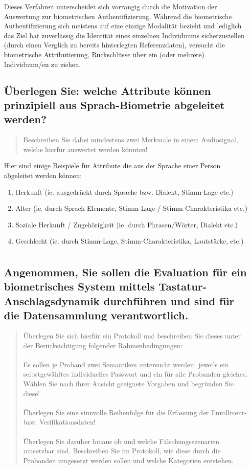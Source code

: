 \documentclass{article}
\newcommand{\annotation}[1]{
    \begin{quote}
    	\begin{textit}{#1}\end{textit}
    \end{quote}
}
\begin{document}
Dieses Verfahren unterscheidet sich vorrangig durch die Motivation der Auswertung zur biometrischen Authentifizierung. 
Während die biometrische Authentifizierung sich meistens auf eine einzige Modalität bezieht und lediglich das Ziel hat
zuverlässig die Identität eines einzelnen Individuums sicherzustellen (durch einen Verglich zu bereits hinterlegten 
Referenzdaten), versucht die biometrische Attributierung, Rückschlüsse über ein (oder mehrere) Individuum/en zu ziehen.

\subsection{Überlegen Sie: welche Attribute können prinzipiell aus Sprach-Biometrie abgeleitet werden?}

\annotation{Beschreiben Sie dabei mindestens zwei Merkmale in einem Audiosignal, welche hierfür auswertet werden könnten!}

Hier sind einige Beispiele für Attribute die aus der Sprache einer Person abgeleitet werden können:

\begin{enumerate}
	\item Herkunft (ie. ausgedrückt durch Sprache bzw. Dialekt, Stimm-Lage etc.)
	\item Alter (ie. durch Sprach-Elemente, Stimm-Lage / Stimm-Charakteristika etc.)
	\item Soziale Herkunft / Zugehörigkeit (ie. durch Phrasen/Wörter, Dialekt etc.)
	\item Geschlecht (ie. durch Stimm-Lage, Stimm-Charakteristika, Lautstärke, etc.)
\end{enumerate}

\section{}

\subsection{Angenommen, Sie sollen die Evaluation für ein biometrisches System mittels Tastatur-Anschlagsdynamik durchführen und sind für die Datensammlung verantwortlich.}

\annotation{Überlegen Sie sich hierfür ein Protokoll und beschreiben
	Sie dieses unter der Berücksichtigung folgender Rahmenbedingungen:\\\\
	Es sollen je Proband zwei Semantiken untersucht werden: jeweils ein
	selbstgewähltes individuelles Passwort und ein für alle Probanden gleiches.
	Wählen Sie nach ihrer Ansicht geeignete Vorgaben und begründen Sie diese!\\\\
	Überlegen Sie eine sinnvolle Reihenfolge für die Erfassung der Enrollment-
	bzw. Verifikationsdaten!\\\\
	Überlegen Sie darüber hinaus ob und welche Fälschungsszenarien umsetzbar sind.
	Beschreiben Sie im Protokoll, wie diese durch die Probanden umgesetzt werden
	sollen und welche Kategorien entstehen.
}
\end{document}

